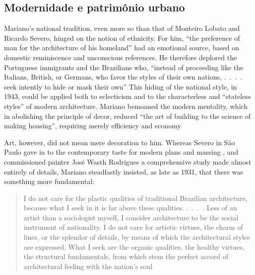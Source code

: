 \hypertarget{modernidade-e-patrimuxf4nio-urbano}{%
\subsection{Modernidade e patrimônio
urbano}\label{modernidade-e-patrimuxf4nio-urbano}}

Mariano's national tradition, even more so than that of Monteiro Lobato
and Ricardo Severo, hinged on the notion of ethnicity. For him, ``the
preference of man for the architecture of his homeland'' had an
emotional source, based on domestic reminiscence and unconscious
references. He therefore deplored the Portuguese immigrants and the
Brazilians who, ``instead of proceeding like the Italians, British, or
Germans, who favor the styles of their own nations, .~.~.~. seek
intently to hide or mask their own''
\autocite[p.~32]{mariannofilho:1943margem} This hiding of the national
style, in 1943, could be applied both to eclecticism and to the
characterless and ``stateless styles'' of modern architecture. Mariano
bemoaned the modern mentality, which in abolishing the principle of
decor, reduced ``the art of building to the science of making housing'',
requiring merely efficiency and economy
\autocite[p.~15]{mariannofilho:1943margem}

Art, however, did not mean mere decoration to him. Whereas Severo in São
Paulo gave in to the contemporary taste for modern plans and massing
\autocite[p.~178]{mello:2007ricardo}, and commissioned painter José
Wasth Rodrigues a comprehensive study made almost entirely of details,
Mariano steadfastly insisted, as late as 1931, that there was something
more fundamental:

\begin{quote}
I do not care for the plastic qualities of traditional Brazilian
architecture, because what I seek in it is far above these qualities.
.~.~.~. Less of an artist than a sociologist myself, I consider
architecture to be the social instrument of nationality. I do not care
for artistic virtues, the charm of lines, or the splendor of details, by
means of which the architectural styles are expressed. What I seek are
the organic qualities, the healthy virtues, the structural fundamentals,
from which stem the perfect accord of architectural feeling with the
nation's soul \autocite[p.~64]{mariannofilho:1943margem}
\end{quote}

